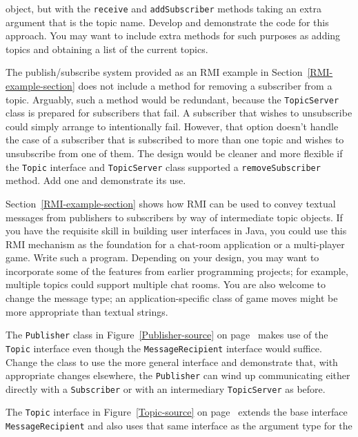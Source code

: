 \begin{chapterEnumerate}
object, but with the {\tt receive} and {\tt addSubscriber} methods taking an extra argument
that is the topic name.  Develop and demonstrate the code for this
approach.  You may want to include extra methods for such purposes as
adding topics and obtaining a list of the current topics.
\item\label{unsubscribe-project}
The publish/subscribe system provided as an RMI example in
Section~\ref{RMI-example-section} does not
include a method for removing a subscriber from a topic.  Arguably, such a
method would be
redundant, because the
{\tt TopicServer} class is prepared for subscribers that
fail.  A subscriber that wishes to unsubscribe could simply arrange to
intentionally fail.  However, that option doesn't handle the case
of a subscriber that is subscribed to more than one topic and wishes to
unsubscribe from one of them.
The design would be cleaner and more
flexible if the {\tt Topic} interface and {\tt TopicServer} class
supported a {\tt removeSubscriber} method.  Add one and demonstrate its use.
\item\label{chat-room-game-project}
Section~\ref{RMI-example-section} shows how RMI can be used to convey
textual messages from publishers to subscribers by way of intermediate
topic objects.  If you have the requisite skill in building user
interfaces in Java, you could use this RMI mechanism as the foundation
for a chat-room application or a multi-player game.  Write such a
program.  Depending on your design, you may want to incorporate some of
the features from earlier programming projects; for example, multiple topics
could support multiple chat rooms.  You are also welcome to change the
message type; an application-specific class of game
moves might be more appropriate than textual strings.
\item\label{publish-to-MessageRecipient-project}
The {\tt Publisher} class in Figure~\ref{Publisher-source} on
page~\pageref{Publisher-source} makes use of the {\tt Topic} interface
even though the {\tt MessageRecipient} interface would suffice.
Change the class to use the more general interface and demonstrate
that, with appropriate changes elsewhere, the {\tt Publisher} can wind
up communicating either directly with a {\tt Subscriber} or with an
intermediary {\tt TopicServer} as before.
\item\label{topic-as-subscriber-project}
The {\tt Topic} interface in Figure~\ref{Topic-source} on
page~\pageref{Topic-source} extends the base interface {\tt MessageRecipient}
and also uses that same interface as the argument type for the {\tt
}
\end{chapterEnumerate}
